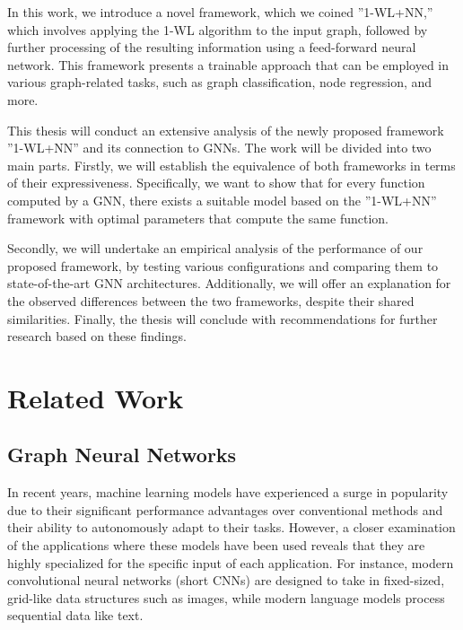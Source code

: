 \documentclass[11pt, dvipsnames, DIV=12]{scrreprt}
\theoremstyle{definition}
\begin{document}
In this work, we introduce a novel framework, which we coined ''1-WL+NN,'' which involves applying the 1-WL algorithm to the input graph, followed by further processing of the resulting information using a feed-forward neural network. This framework presents a trainable approach that can be employed in various graph-related tasks, such as graph classification, node regression, and more.

This thesis will conduct an extensive analysis of the newly proposed framework ''1-WL+NN'' and its connection to GNNs. The work will be divided into two main parts. Firstly, we will establish the equivalence of both frameworks in terms of their expressiveness. Specifically, we want to show that for every function computed by a GNN, there exists a suitable model based on the ''1-WL+NN'' framework with optimal parameters that compute the same function.

Secondly, we will undertake an empirical analysis of the performance of our proposed framework, by testing various configurations and comparing them to state-of-the-art GNN architectures. Additionally, we will offer an explanation for the observed differences between the two frameworks, despite their shared similarities. Finally, the thesis will conclude with recommendations for further research based on these findings.

\section{Related Work}
\subsection{Graph Neural Networks}
In recent years, machine learning models have experienced a surge in popularity due to their significant performance advantages over conventional methods and their ability to autonomously adapt to their tasks. However, a closer examination of the applications where these models have been used reveals that they are highly specialized for the specific input of each application. For instance, modern convolutional neural networks (short CNNs) are designed to take in fixed-sized, grid-like data structures such as images, while modern language models process sequential data like text.
\end{document}
